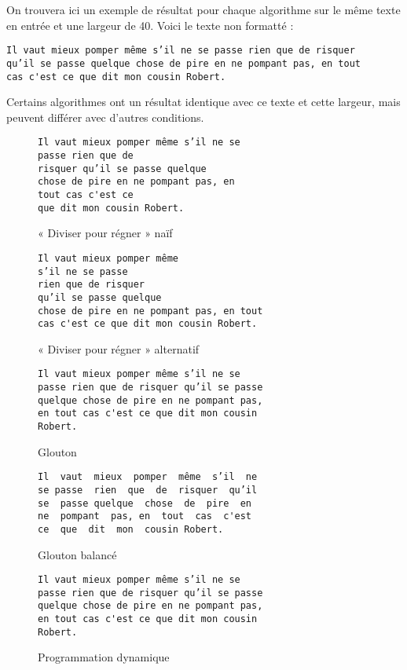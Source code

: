 \documentclass[a4paper, 11pt]{article}
\begin{document}
On trouvera ici un exemple de résultat pour chaque algorithme sur le même texte
en entrée et une largeur de 40. Voici le texte non formatté :

\begin{verbatim}
Il vaut mieux pomper même s’il ne se passe rien que de risquer
qu’il se passe quelque chose de pire en ne pompant pas, en tout
cas c'est ce que dit mon cousin Robert.
\end{verbatim}

Certains algorithmes ont un résultat identique avec ce texte et cette largeur, mais peuvent différer avec d'autres conditions.

\begin{figure}
\begin{verbatim}
Il vaut mieux pomper même s’il ne se
passe rien que de
risquer qu’il se passe quelque
chose de pire en ne pompant pas, en
tout cas c'est ce
que dit mon cousin Robert.
\end{verbatim}
\caption{« Diviser pour régner » naïf}
\end{figure}

\begin{figure}
\begin{verbatim}
Il vaut mieux pomper même
s’il ne se passe
rien que de risquer
qu’il se passe quelque
chose de pire en ne pompant pas, en tout
cas c'est ce que dit mon cousin Robert.
\end{verbatim}
\caption{« Diviser pour régner » alternatif}
\end{figure}

\begin{figure}
\begin{verbatim}
Il vaut mieux pomper même s’il ne se
passe rien que de risquer qu’il se passe
quelque chose de pire en ne pompant pas,
en tout cas c'est ce que dit mon cousin
Robert.
\end{verbatim}
\caption{Glouton}
\end{figure}

\begin{figure}
\begin{verbatim}
Il  vaut  mieux  pomper  même  s’il  ne
se passe  rien  que  de  risquer  qu’il
se  passe quelque  chose  de  pire  en
ne  pompant  pas, en  tout  cas  c'est
ce  que  dit  mon  cousin Robert.
\end{verbatim}
\caption{Glouton balancé}
\end{figure}

\begin{figure}
\begin{verbatim}
Il vaut mieux pomper même s’il ne se
passe rien que de risquer qu’il se passe
quelque chose de pire en ne pompant pas,
en tout cas c'est ce que dit mon cousin
Robert.
\end{verbatim}
\caption{Programmation dynamique}
\end{figure}
\end{document}
